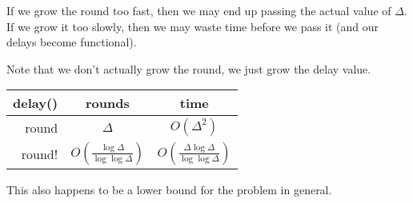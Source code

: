 \documentclass{idc_msc}
\begin{document}
If we grow the round too fast, then we may end up passing the actual value of $\Delta$.
If we grow it too slowly, then we may waste time before we pass it (and our delays become functional).

Note that we don't actually grow the round, we just grow the delay value.

\begin{tabu} to \linewidth{|r|c|c|}
\hline
delay() & rounds & time \\
\hline
round & $\Delta$ & $O(\Delta^2)$ \\
\hline
round! & $O\left(\frac{\log \Delta}{\log \log \Delta}\right)$ & $O\left(\frac{\Delta \log \Delta}{\log \log \Delta}\right)$ \\
\hline
\end{tabu}

This also happens to be a lower bound for the problem in general.
\end{document}
